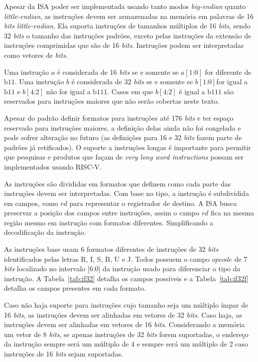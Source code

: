   Apesar da ISA poder ser implementada usando tanto modos \emph{big-endian} quanto \emph{little-endian},
  as instruções devem ser armazenadas na memória em palavras de 16 \emph{bits little-endian}.
  Ela suporta instruções de tamanhos múltiplos de 16 \emph{bits}, sendo 32 \emph{bits} o tamanho das 
  instruções padrões, exceto pelas instruções da extensão de instruções comprimidas que são de 16 \emph{bits}.
  Instruções podem ser interpretadas como vetores de \emph{bits}.

  Uma instrução $a$ é considerada de 16 \emph{bits} se e somente se $a[1\text{:}0]$ for diferente de $\text{b}11$.
  Uma instrução $b$ é considerada de 32 \emph{bits} se e somente se $b[1\text{:}0]$for igual a $\text{b}11$ 
  e $b[4\text{:}2]$ não for igual a $\text{b}111$. Casos em que $b[4\text{:}2]$ é igual a $\text{b}111$ são
  reservados para instruções maiores que não serão cobertas neste texto.

  Apesar do padrão definir formatos para instruções até 176 \emph{bits} e ter espaço reservado para instruções
  maiores, a definição delas ainda não foi congelada e pode sofrer alteração no futuro 
  (as definições para 16 e 32 \emph{bits} fazem parte de padrões já retificados).
  O suporte a instruções longas é importante para permitir que pesquisas e produtos que façam de 
  \emph{very long word instructions} \citep{VLWI} possam ser implementados usando RISC-V.
  
  As instruções são divididas em formatos que definem como cada parte das instruções devem ser interpretadas. 
  Com base no tipo, a instrução é subdividida em campos, como $rd$ para representar o registrador de destino.
  A ISA busca preservar a posição dos campos entre instruções, assim o campo $rd$ fica na mesma região mesmo
  em instrução com formatos diferentes. Simplificando a decodificação da instrução.

  As instruções base usam 6 formatos diferentes de instruções de 32 \emph{bits} identificados pelas letras 
  R, I, S, B, U e J. Todos possuem o campo $opcode$ de 7 \emph{bits} localizado no intervalo [6:0] 
  da instrução usado para diferenciar o tipo da instrução. 
  A Tabela~\ref{tab:if32} detalha os campos possíveis e a Tabela~\ref{tab:if32f} detalha os campos presentes em cada formato.

  Caso não haja suporte para instruções cujo tamanho seja um múltiplo ímpar de 16 \emph{bits}, as instruções 
  devem ser alinhadas em vetores de 32 \emph{bits}. Caso haja, as instruções devem ser alinhadas em 
  vetores de 16 \emph{bits}. Considerando a memória um vetor de 8 \emph{bits}, se apenas instruções de 
  32 \emph{bits} forem suportadas, o endereço da instrução sempre será um múltiplo de 4 e sempre será um 
  múltiplo de 2 caso instruções de 16 \emph{bits} sejam suportadas.

